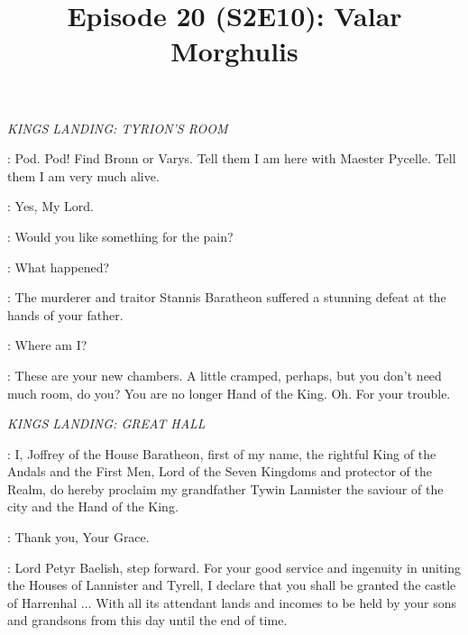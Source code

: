 ﻿

\title{Episode 20 (S2E10): Valar Morghulis}
\author{}
\date{}
\maketitle


\scene

\textit{KINGS LANDING: TYRION'S ROOM} 


\TYRION: Pod. Pod!  Find Bronn or Varys. Tell them I am here with Maester Pycelle. Tell them I am very much alive. 

\PODRICK: Yes, My Lord. 

\PYCELLE: Would you like something for the pain? 

\TYRION: What happened? 

\PYCELLE: The murderer and traitor Stannis Baratheon suffered a stunning defeat at the hands of your father. 

\TYRION: Where am I? 

\PYCELLE: These are your new chambers. A little cramped, perhaps, but you don't need much room, do you? You are no longer Hand of the King. Oh. For your trouble. 



\scene

\textit{KINGS LANDING: GREAT HALL} 


\JOFFREY: I, Joffrey of the House Baratheon, first of my name, the rightful King of the Andals and the First Men, Lord of the Seven Kingdoms and protector of the Realm, do hereby proclaim my grandfather Tywin Lannister the saviour of the city and the Hand of the King. 

\TYWIN: Thank you, Your Grace. 

\JOFFREY: Lord Petyr Baelish, step forward. For your good service and ingenuity in uniting the Houses of Lannister and Tyrell, I declare that you shall be granted the castle of Harrenhal $\ldots$ With all its attendant lands and incomes to be held by your sons and grandsons from this day until the end of time. 

